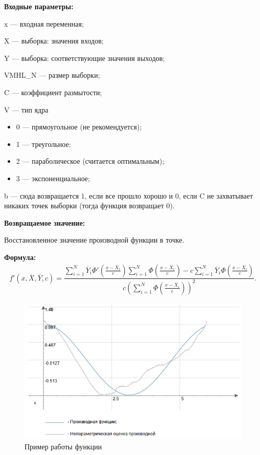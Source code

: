 \textbf{Входные параметры:} 
 
x --- входная переменная;
 
X --- выборка: значения входов;
 
Y --- выборка: соответствующие значения выходов;
 
VMHL\_N --- размер выборки;
 
C --- коэффициент размытости;
 
V --- тип ядра
 
 \begin{itemize}
 \item  0 --- прямоугольное (не рекомендуется);
 \item  1 --- треугольное;
 \item  2 --- параболическое (считается оптимальным);
 \item  3 --- экспоненциальное;
 \end{itemize}
 
b --- сюда возвращается 1, если все прошло хорошо и 0, если C не захватывает никаких точек выборки (тогда функция возвращает 0).

\textbf{Возвращаемое значение:}
 
 Восстановленное значение производной функции в точке.

\textbf{Формула:}
\begin{eqnarray*}
{f}'\left( x, \overline{X},\overline{Y}, c\right) =\dfrac{\sum_{i=1}^{N}\overline{Y}_i{\Phi}'\left( \frac{x-\overline{X}_i}{c}\right) \sum_{i=1}^{N}\Phi\left( \frac{x-\overline{X}_i}{c}\right)-c \sum_{i=1}^{N}\overline{Y}_i\Phi\left( \frac{x-\overline{X}_i}{c}\right)}{c\left( \sum_{i=1}^{N}\Phi\left( \frac{x-\overline{X}_i}{c}\right)\right)^2 }.
\end{eqnarray*}

 \begin{figure} [h] 
   \center
   \includegraphics {MHL_NonparametricEstimatorOfDerivative4.png}
   \caption{Пример работы функции} 
   \label{img:MHL_NonparametricEstimatorOfDerivative4}  
 \end{figure}